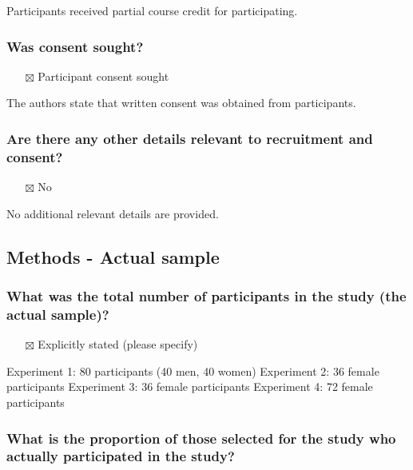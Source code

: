 \documentclass[
  doc, a4paper]{apa7}
\providecommand{\tightlist}{%
  \setlength{\itemsep}{0pt}\setlength{\parskip}{0pt}}
\begin{document}
Participants received partial course credit for participating.

\subsubsection{Was consent sought?}\label{was-consent-sought}

\begin{itemize}
\tightlist
\item[$\boxtimes$]
  Participant consent sought
\end{itemize}

The authors state that written consent was obtained from participants.

\subsubsection{Are there any other details relevant to recruitment and consent?}\label{are-there-any-other-details-relevant-to-recruitment-and-consent}

\begin{itemize}
\tightlist
\item[$\boxtimes$]
  No
\end{itemize}

No additional relevant details are provided.

\subsection{Methods - Actual sample}\label{methods---actual-sample}

\subsubsection{What was the total number of participants in the study (the actual sample)?}\label{what-was-the-total-number-of-participants-in-the-study-the-actual-sample}

\begin{itemize}
\tightlist
\item[$\boxtimes$]
  Explicitly stated (please specify)
\end{itemize}

Experiment 1: 80 participants (40 men, 40 women)
Experiment 2: 36 female participants
Experiment 3: 36 female participants
Experiment 4: 72 female participants

\subsubsection{What is the proportion of those selected for the study who actually participated in the study?}\label{what-is-the-proportion-of-those-selected-for-the-study-who-actually-participated-in-the-study}
\end{document}
